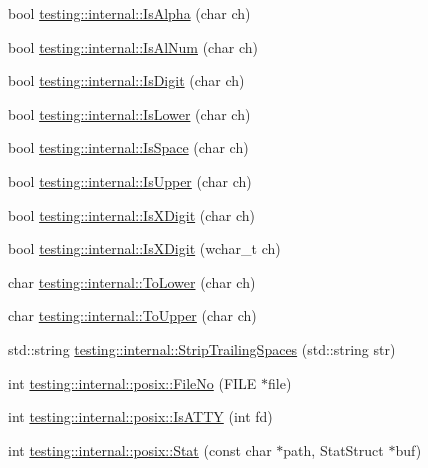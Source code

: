 \begin{DoxyCompactItemize}
\item 
bool \hyperlink{namespacetesting_1_1internal_aeb957087fd6bbf9db98ab7cd41b0c129}{testing\+::internal\+::\+Is\+Alpha} (char ch)
\item 
bool \hyperlink{namespacetesting_1_1internal_a83802e7f23324cd512232203662e1a98}{testing\+::internal\+::\+Is\+Al\+Num} (char ch)
\item 
bool \hyperlink{namespacetesting_1_1internal_a4bd96b7fa6486802d33ddc217af55a39}{testing\+::internal\+::\+Is\+Digit} (char ch)
\item 
bool \hyperlink{namespacetesting_1_1internal_ac26ce3883bc8919c27074975e958f3b7}{testing\+::internal\+::\+Is\+Lower} (char ch)
\item 
bool \hyperlink{namespacetesting_1_1internal_af429e04f70f9c10f6aa76a5d1ccd389f}{testing\+::internal\+::\+Is\+Space} (char ch)
\item 
bool \hyperlink{namespacetesting_1_1internal_a84f3baa379fec6bf5947cb5165aa8cc9}{testing\+::internal\+::\+Is\+Upper} (char ch)
\item 
bool \hyperlink{namespacetesting_1_1internal_aa234ef141278263fb143b616c74c86e7}{testing\+::internal\+::\+Is\+X\+Digit} (char ch)
\item 
bool \hyperlink{namespacetesting_1_1internal_a6ab68a30f8291c09b2289c132bbe3b16}{testing\+::internal\+::\+Is\+X\+Digit} (wchar\+\_\+t ch)
\item 
char \hyperlink{namespacetesting_1_1internal_ad9c627ef2a94245e3fd69e7ab3d49b42}{testing\+::internal\+::\+To\+Lower} (char ch)
\item 
char \hyperlink{namespacetesting_1_1internal_ac1b876a8133895bd553d4780ecaa1e3a}{testing\+::internal\+::\+To\+Upper} (char ch)
\item 
std\+::string \hyperlink{namespacetesting_1_1internal_aa6afda12e567c353e2e9b9c2e8cae14f}{testing\+::internal\+::\+Strip\+Trailing\+Spaces} (std\+::string str)
\item 
int \hyperlink{namespacetesting_1_1internal_1_1posix_a3117b067e1f942a2031e666953120ccc}{testing\+::internal\+::posix\+::\+File\+No} (F\+I\+LE $\ast$file)
\item 
int \hyperlink{namespacetesting_1_1internal_1_1posix_a16ebe936b3a8ea462a94191635aedc27}{testing\+::internal\+::posix\+::\+Is\+A\+T\+TY} (int fd)
\item 
int \hyperlink{namespacetesting_1_1internal_1_1posix_a2b87b7ff647a128614daf50667eb9304}{testing\+::internal\+::posix\+::\+Stat} (const char $\ast$path, Stat\+Struct $\ast$buf)
\item 

\end{DoxyCompactItemize}
